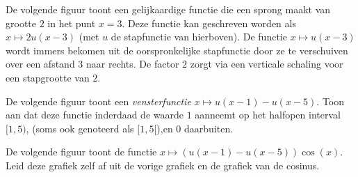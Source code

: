 De volgende figuur toont een gelijkaardige functie
die een sprong maakt van grootte $2$ in het punt $x=3$. Deze functie
kan geschreven worden als $x\mapsto 2u(x-3)$ (met $u$ de stapfunctie
van hierboven). De functie $x\mapsto u(x-3)$ wordt immers bekomen uit
de oorspronkelijke stapfunctie door ze te verschuiven over een afstand
$3$ naar rechts. De factor $2$ zorgt via een verticale schaling voor
een stapgrootte van $2$.

\begin{center}
\end{center}

De volgende figuur toont een {\em vensterfunctie} $x\mapsto
u(x-1)-u(x-5)$. Toon aan dat deze functie inderdaad de waarde $1$
aanneemt op het halfopen interval $[1,5)$, (soms ook genoteerd als
$[1,5[$),en $0$ daarbuiten.

\begin{center}
\end{center}

De volgende figuur toont de functie $x\mapsto
(u(x-1)-u(x-5))\cos(x)$. Leid deze grafiek zelf af uit de vorige
grafiek en de grafiek van de cosinus.

